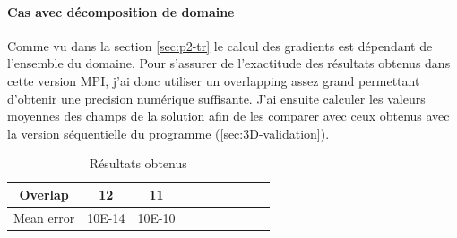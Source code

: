 \paragraph{Cas avec décomposition de domaine}
Comme vu dans la section \ref{sec:p2-tr} le calcul des gradients est dépendant de l'ensemble du domaine. Pour s'assurer de l'exactitude des résultats obtenus dans cette version MPI, j'ai donc utiliser un overlapping assez grand permettant d'obtenir une precision numérique suffisante. J'ai ensuite calculer les valeurs moyennes des champs de la solution afin de les comparer avec ceux obtenus avec la version séquentielle du programme (\ref{sec:3D-validation}).

\begin{table}[h]
  \begin{center}
    \begin{tabular}{|c|c|c||c|c|c|c||c|c|c|}
      \hline
      Overlap & 12 & 11 \\
      \hline
      Mean error & 10E-14 & 10E-10 \\
      \hline
    
    \end{tabular}
    \caption{\label{arr:overlap_res} Résultats obtenus}
  \end{center}
\end{table}
